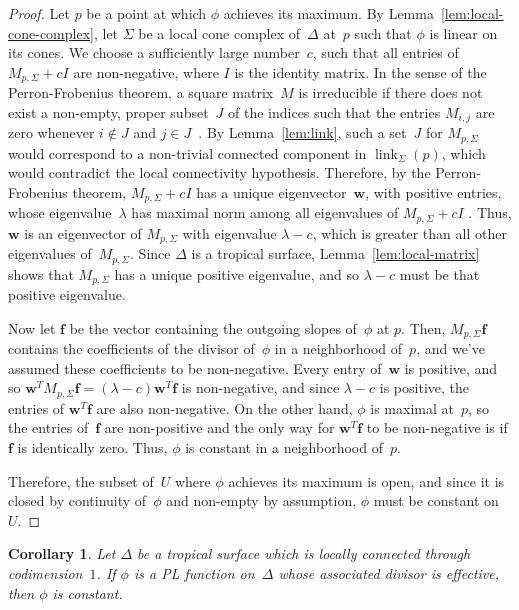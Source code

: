 \documentclass[11pt]{amsart}
\newtheorem{cor}[thm]{Corollary}
\theoremstyle{definition}
\newcommand{\bff}{\mathbf f}
\newcommand{\link}{\operatorname{link}}
\begin{document}
\begin{proof}
Let $p$ be a point at which $\phi$ achieves its maximum. By
Lemma~\ref{lem:local-cone-complex}, let $\Sigma$ be a local cone complex
of~$\Delta$ at~$p$ such that $\phi$ is linear on its cones. We choose a
sufficiently large number~$c$, such that all entries of $M_{p,\Sigma} + cI$ are
non-negative, where $I$ is the identity matrix. In the sense of the
Perron-Frobenius theorem, a square matrix~$M$ is irreducible if there does not
exist a non-empty, proper subset~$J$ of the indices such that the entries
$M_{i,j}$ are zero whenever $i \not\in J$ and $j \in
J$~\cite[Def.~2.1.2]{berman-plemmons}. By Lemma~\ref{lem:link},
such a set~$J$ for $M_{p,\Sigma}$ would correspond
to a non-trivial connected component in $\link_\Sigma(p)$, which would
contradict the local connectivity hypothesis. Therefore, by the Perron-Frobenius theorem,
$M_{p, \Sigma} + cI$ has a unique eigenvector~$\mathbf w$, with positive
entries, whose eigenvalue~$\lambda$ has maximal norm among all eigenvalues of
$M_{p,\Sigma} + cI$ \cite[Thm.~2.1.3b, 2.1.1b]{berman-plemmons}. Thus, $\mathbf
w$ is an eigenvector of $M_{p,\Sigma}$ with eigenvalue $\lambda - c$, which is
greater than all other eigenvalues of~$M_{p,\Sigma}$. Since $\Delta$ is a
tropical surface, Lemma~\ref{lem:local-matrix} shows that $M_{p, \Sigma}$
has a unique positive eigenvalue, and so $\lambda - c$ must be that positive
eigenvalue.

Now let $\bff$ be the vector containing the outgoing slopes of~$\phi$ at $p$.
Then, $M_{p,\Sigma} \bff$ contains the coefficients of the divisor of~$\phi$ in
a neighborhood of~$p$, and we've assumed these coefficients to be non-negative.
Every entry of~$\mathbf w$ is positive, and so $\mathbf w^T M_{p,\Sigma} \bff =
(\lambda - c) \mathbf w^T \bff$ is non-negative, and since
$\lambda - c$ is positive, the entries of $\mathbf w^T \bff$ are also non-negative. On
the other hand, $\phi$ is maximal at~$p$, so the entries of~$\bff$ are
non-positive and the only way for $\mathbf w^T \bff$ to be non-negative is if
$\bff$ is identically zero. Thus, $\phi$ is constant in a neighborhood of~$p$.

Therefore, the subset of~$U$ where $\phi$ achieves its maximum is open, and
since it is closed by continuity of~$\phi$ and non-empty by assumption, $\phi$
must be constant on~$U$.
\end{proof}

\begin{cor}\label{cor:no-regular}
Let $\Delta$ be a tropical surface which is locally connected through
codimension~$1$. If $\phi$ is a PL function on~$\Delta$ whose associated divisor
is effective, then $\phi$ is constant.
\end{cor}
\end{document}
